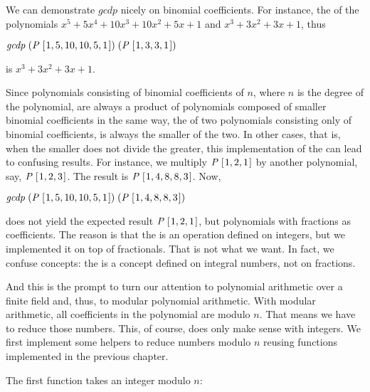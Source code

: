 \documentclass[tikz]{scrreprt}
\newcommand{\Conid}[1]{\mathit{#1}}
\newcommand{\Varid}[1]{\mathit{#1}}
\begin{document}
We can demonstrate \ensuremath{\Varid{gcdp}} nicely on binomial coefficients.
For instance, the  of the polynomials
$x^5 + 5x^4 + 10x^3 + 10x^2 + 5x + 1$ and
$x^3 + 3x^2 + 3x + 1$, thus

\ensuremath{\Varid{gcdp}\;(\Conid{P}\;[\mskip1.5mu \mathrm{1},\mathrm{5},\mathrm{10},\mathrm{10},\mathrm{5},\mathrm{1}\mskip1.5mu])\;(\Conid{P}\;[\mskip1.5mu \mathrm{1},\mathrm{3},\mathrm{3},\mathrm{1}\mskip1.5mu])}

is $x^3 + 3x^2 + 3x + 1$.

Since polynomials consisting of binomial coefficients of $n$,
where $n$ is the degree of the polynomial,
are always a product
of polynomials composed of smaller binomial coefficients
in the same way,
the  of two polynomials
consisting only of binomial coefficients,
is always the smaller of the two.
In other cases, that is, when the smaller does not divide
the greater, this implementation of the 
can lead to confusing results. For instance,
we multiply \ensuremath{\Conid{P}\;[\mskip1.5mu \mathrm{1},\mathrm{2},\mathrm{1}\mskip1.5mu]} by another polynomial, say,
\ensuremath{\Conid{P}\;[\mskip1.5mu \mathrm{1},\mathrm{2},\mathrm{3}\mskip1.5mu]}. The result is \ensuremath{\Conid{P}\;[\mskip1.5mu \mathrm{1},\mathrm{4},\mathrm{8},\mathrm{8},\mathrm{3}\mskip1.5mu]}. Now,

\ensuremath{\Varid{gcdp}\;(\Conid{P}\;[\mskip1.5mu \mathrm{1},\mathrm{5},\mathrm{10},\mathrm{10},\mathrm{5},\mathrm{1}\mskip1.5mu])\;(\Conid{P}\;[\mskip1.5mu \mathrm{1},\mathrm{4},\mathrm{8},\mathrm{8},\mathrm{3}\mskip1.5mu])}

does not yield the expected result \ensuremath{\Conid{P}\;[\mskip1.5mu \mathrm{1},\mathrm{2},\mathrm{1}\mskip1.5mu]},
but polynomials with fractions as coefficients.
The reason is that the  is an operation
defined on integers, but we implemented it on top
of fractionals. That is not what we want.
In fact, we confuse concepts: the  is
a concept defined on integral numbers, not on fractions.

And this is the prompt to 
turn our attention to polynomial arithmetic
over a finite field and, thus, to modular polynomial arithmetic.
With modular arithmetic, all coefficients in the polynomial
are modulo $n$. That means we have to reduce those numbers.
This, of course, does only make sense with integers.
We first implement some helpers to reduce numbers modulo $n$
reusing functions implemented in the previous chapter.

The first function takes an integer modulo $n$:
\end{document}
